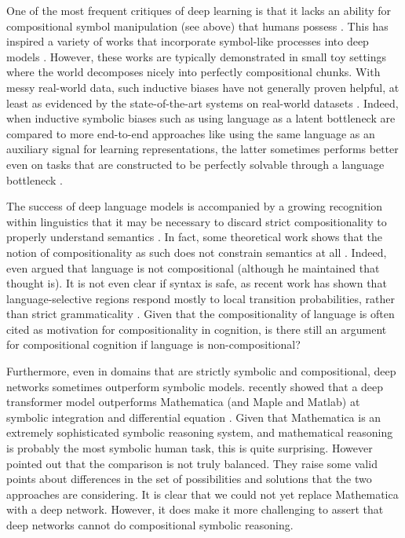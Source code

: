 One of the most frequent critiques of deep learning is that it lacks an ability for compositional symbol manipulation (see above) that humans possess \citep[e.g.][]{Lake2016,Lake2017,Marcus2018}. This has inspired a variety of works that incorporate symbol-like processes into deep models \citep[e.g.][]{Mao2019}. However, these works are typically demonstrated in small toy settings where the world decomposes nicely into perfectly compositional chunks. With messy real-world data, such inductive biases have not generally proven helpful, at least as evidenced by the state-of-the-art systems on real-world datasets \citep[e.g.][]{Radford2019}. Indeed, when inductive symbolic biases such as using language as a latent bottleneck are compared to more end-to-end approaches like using the same language as an auxiliary signal for learning representations, the latter sometimes performs better even on tasks that are constructed to be perfectly solvable through a language bottleneck \citep{Mu2019}. \par  
The success of deep language models is accompanied by a growing recognition within linguistics that it may be necessary to discard strict compositionality to properly understand semantics \citep{Goldberg2015,Potts2019}. In fact, some theoretical work shows that the notion of compositionality as such does not constrain semantics at all \citep{Zadrozny1992}. Indeed, even \citet{Fodor2001} argued that language is not compositional (although he maintained that thought is). It is not even clear if syntax is safe, as recent work has shown that language-selective regions respond mostly to local transition probabilities, rather than strict grammaticality \citet{Mollica2020}. Given that the compositionality of language is often cited as motivation for compositionality in cognition, is there still an argument for compositional cognition if language is non-compositional? \par 
Furthermore, even in domains that are strictly symbolic and compositional, deep networks sometimes outperform symbolic models. \citet{Lample2019} recently showed that a deep transformer model outperforms Mathematica (and Maple and Matlab) at symbolic integration and differential equation \citep{Lample2019}. Given that Mathematica is an extremely sophisticated symbolic reasoning system, and mathematical reasoning is probably the most symbolic human task, this is quite surprising. However \citet{Davis2019} pointed out that the comparison is not truly balanced. They raise some valid points about differences in the set of possibilities and solutions that the two approaches are considering. It is clear that we could not yet replace Mathematica with a deep network. However, it does make it more challenging to assert that deep networks cannot do compositional symbolic reasoning. \par
